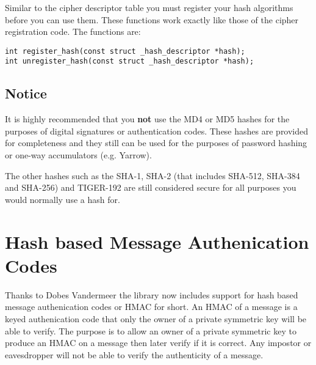 \documentclass{book}
\begin{document}
Similar to the cipher descriptor table you must register your hash algorithms before you can use them.  These functions
work exactly like those of the cipher registration code.  The functions are:
\begin{verbatim}
int register_hash(const struct _hash_descriptor *hash);
int unregister_hash(const struct _hash_descriptor *hash);
\end{verbatim}

\subsection{Notice}
It is highly recommended that you \textbf{not} use the MD4 or MD5 hashes for the purposes of digital signatures or authentication codes.  
These hashes are provided for completeness and they still can be used for the purposes of password hashing or one-way accumulators
(e.g. Yarrow).

The other hashes such as the SHA-1, SHA-2 (that includes SHA-512, SHA-384 and SHA-256) and TIGER-192 are still considered secure
for all purposes you would normally use a hash for.

\section{Hash based Message Authenication Codes}
Thanks to Dobes Vandermeer the library now includes support for hash based message authenication codes or HMAC for short.  An HMAC
of a message is a keyed authenication code that only the owner of a private symmetric key will be able to verify.  The purpose is
to allow an owner of a private symmetric key to produce an HMAC on a message then later verify if it is correct.  Any impostor or
eavesdropper will not be able to verify the authenticity of a message.  
\end{document}
